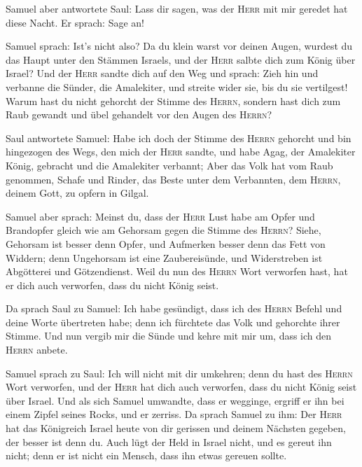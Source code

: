  Samuel aber antwortete Saul: Lass dir sagen, was der
\textsc{Herr} mit mir geredet hat diese Nacht. Er sprach: Sage an!

 Samuel sprach: Ist's nicht also? Da du klein warst vor
deinen Augen, wurdest du das Haupt unter den Stämmen Israels, und der
\textsc{Herr} salbte dich zum König über Israel?  Und der
\textsc{Herr} sandte dich auf den Weg und sprach: Zieh hin und verbanne
die Sünder, die Amalekiter, und streite wider sie, bis du sie
vertilgest!  Warum hast du nicht gehorcht der Stimme des
\textsc{Herrn}, sondern hast dich zum Raub gewandt und übel gehandelt
vor den Augen des \textsc{Herrn}?

 Saul antwortete Samuel: Habe ich doch der Stimme des
\textsc{Herrn} gehorcht und bin hingezogen des Wegs, den mich der
\textsc{Herr} sandte, und habe Agag, der Amalekiter König, gebracht und
die Amalekiter verbannt;  Aber das Volk hat vom Raub
genommen, Schafe und Rinder, das Beste unter dem Verbannten, dem
\textsc{Herrn}, deinem Gott, zu opfern in Gilgal.

 Samuel aber sprach: Meinst du, dass der \textsc{Herr}
Lust habe am Opfer und Brandopfer gleich wie am Gehorsam gegen die
Stimme des \textsc{Herrn}? Siehe, Gehorsam ist besser denn Opfer, und
Aufmerken besser denn das Fett von Widdern;  denn
Ungehorsam ist eine Zaubereisünde, und Widerstreben ist Abgötterei und
Götzendienst. Weil du nun des \textsc{Herrn} Wort verworfen hast, hat er
dich auch verworfen, dass du nicht König seist.

 Da sprach Saul zu Samuel: Ich habe gesündigt, dass ich
des \textsc{Herrn} Befehl und deine Worte übertreten habe; denn ich
fürchtete das Volk und gehorchte ihrer Stimme.  Und nun
vergib mir die Sünde und kehre mit mir um, dass ich den \textsc{Herrn}
anbete.

 Samuel sprach zu Saul: Ich will nicht mit dir umkehren;
denn du hast des \textsc{Herrn} Wort verworfen, und der \textsc{Herr}
hat dich auch verworfen, dass du nicht König seist über Israel.
 Und als sich Samuel umwandte, dass er wegginge, ergriff
er ihn bei einem Zipfel seines Rocks, und er zerriss.  Da
sprach Samuel zu ihm: Der \textsc{Herr} hat das Königreich Israel heute
von dir gerissen und deinem Nächsten gegeben, der besser ist denn du.
 Auch lügt der Held in Israel nicht, und es gereut ihn
nicht; denn er ist nicht ein Mensch, dass ihn etwas gereuen sollte.

